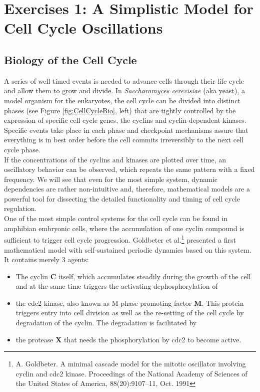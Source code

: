 \documentclass[a4paper,11pt,twoside]{article}
\begin{document}
\newpage
\section{Exercises 1: A Simplistic Model for Cell Cycle Oscillations}
\subsection{Biology of the Cell Cycle}
A series of well timed events is needed to advance cells through their life cycle and allow them to grow and divide. In {\it Saccharomyces cerevisiae} (aka yeast), a model organism for the eukaryotes, the cell cycle can be divided into distinct phases (see Figure \ref{fig:CellCycleBio}, left) that are tightly controlled by the expression of specific cell cycle genes, the cyclins and cyclin-dependent kinases. Specific events take place in each phase and checkpoint mechanisms assure that everything is in best order before the cell commits irreversibly to the next cell cycle phase.\\
%
If the concentrations of the cyclins and kinases are plotted over time, an oscillatory behavior can be observed, which repeats the same pattern with a fixed frequency. We will see that even for the most simple system, dynamic dependencies are rather non-intuitive and, therefore, mathematical models are a powerful tool for dissecting the detailed functionality and timing of cell cycle regulation.\\
One of the most simple control systems for the cell cycle can be found in amphibian embryonic cells, where the accumulation of one cyclin compound is sufficient to trigger cell cycle progression. Goldbeter et al.\footnote{A. Goldbeter. A minimal cascade model for the mitotic oscillator involving cyclin and cdc2 kinase. Proceedings of the National Academy of Sciences of the United States of America, 88(20):9107–11, Oct. 1991} presented a first mathematical model with self-sustained periodic dynamics based on this system. It contains merely 3 agents: 
\begin{itemize}
 \item The cyclin {\bf C} itself, which accumulates steadily during the growth of the cell and at the same time triggers the activating dephosphorylation of
 \item the cdc2 kinase, also known as M-phase promoting factor {\bf M}. This protein triggers entry into cell division as well as the re-setting of the cell cycle by degradation of the cyclin. The degradation is facilitated by  
 \item the protease {\bf X} that needs the phosphorylation by cdc2 to become active.
\end{itemize}
\end{document}
